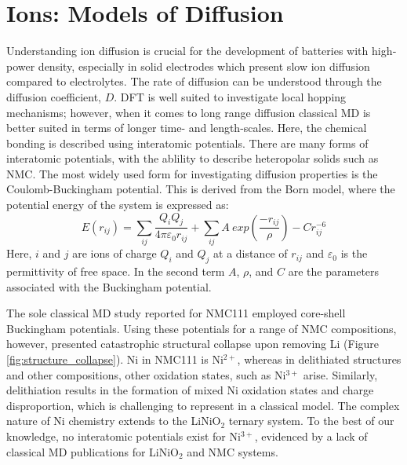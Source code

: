 \documentclass[journal=jacsat,manuscript=article]{achemso}
\begin{document}
\section*{Ions: Models of Diffusion}
Understanding ion diffusion is crucial for the development of batteries with high‐power density, especially in solid electrodes which present slow ion diffusion compared to electrolytes. 
The rate of diffusion can be understood through the diffusion coefficient, $D$. 
DFT is well suited to investigate local hopping mechanisms;\cite{van_der_ven_layered_2001, van_der_ven_LiTiS2_2008} however, when it comes to long range diffusion classical MD is better suited in terms of longer time- and length-scales. 
Here, the chemical bonding is described using interatomic potentials. 
There are many forms of interatomic potentials, with the ablility to describe heteropolar solids such as NMC. 
The most widely used form for investigating diffusion properties is the Coulomb-Buckingham potential. \cite{buckingham_classical_1938} 
This is derived from the Born model\cite{born_1932, mayer_1932}, where the potential energy of the system is expressed as:
%
\begin{equation}
    E(r_{ij}) =  \sum_{ij} \frac{Q_i Q_j}{4\pi \varepsilon_0 r_{ij}} + \sum_{ij} A \ exp(\frac{-r_{ij}}{\rho}) - Cr_{ij}^{-6}
\end{equation}
%
Here, $i$ and $j$ are ions of charge $Q_i$ and $Q_j$ at a distance of $r_{ij}$ and $\varepsilon_0$ is the permittivity of free space. In the second term $A$, $\rho$, and $C$ are the parameters associated with the Buckingham potential.

The sole classical MD study reported for NMC111  employed core-shell Buckingham potentials. \cite{Lee_and_Park_2012} 
Using these potentials for a range of NMC compositions, however, presented  catastrophic structural collapse upon removing Li (Figure \ref{fig:structure_collapse}). Ni in NMC111 is Ni$^{2+}$, whereas in delithiated structures and other compositions, other oxidation states, such as Ni$^{3+}$ arise. Similarly, delithiation results in the formation of mixed Ni oxidation states and charge disproportion, which is challenging to represent in a classical model. \cite{Nakamura_2019,Kim_2002,Alonso_1999} 
The complex nature of Ni chemistry extends to the LiNiO$_2$ ternary system. To the best of our knowledge, no interatomic potentials exist for Ni$^{3+}$, evidenced by a lack of classical MD publications for LiNiO$_2$ and NMC systems. %
\end{document}
